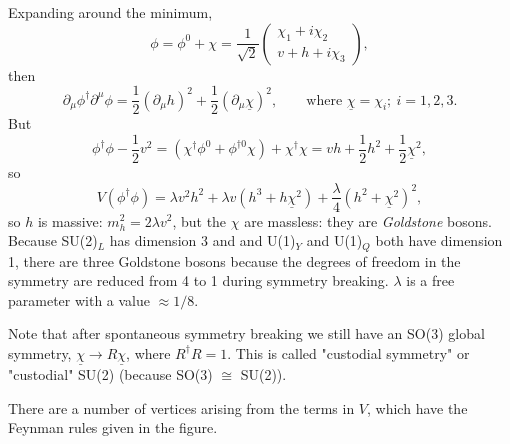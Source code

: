 Expanding around the minimum,
\[\phi = \phi^0 + \chi = \frac{1}{\sqrt{2}} \left( \begin{array}{cc}
\chi_1 + i \chi_2  \\
v + h + i \chi_3  \end{array} \right), \]
then 
\begin{equation}
\partial_\mu \phi^\dagger \partial^\mu \phi = \frac{1}{2} (\partial_\mu h)^2 + \frac{1}{2} (\partial_\mu \underline{\chi})^2, \qquad \text{where } \underline{\chi} = \chi_i; \ i=1,2,3.
\end{equation}
But
\begin{equation}
\phi^\dagger \phi -\frac{1}{2}v^2 = (\chi^\dagger \phi^0 + \phi^{\dagger 0}\chi) + \chi^\dagger \chi = vh + \frac{1}{2}h^2 + \frac{1}{2}\underline{\chi}^2,
\end{equation}
so 
\begin{equation}
V(\phi^\dagger \phi) = \lambda v^2 h^2 + \lambda v (h^3 + h \underline{\chi}^2) + \frac{\lambda}{4}(h^2 + \underline{\chi}^2)^2,
\end{equation}
so $h$ is massive: $m_h^2 = 2 \lambda v^2$, but the $\chi$ are massless: they are \textit{Goldstone} bosons. Because SU(2)$_L$ has dimension 3 and and U(1)$_Y$ and U(1)$_Q$ both have dimension 1, there are three Goldstone bosons because the degrees of freedom in the symmetry are reduced from 4 to 1 during symmetry breaking. $\lambda$ is a free parameter with a value $\approx 1/8$. 

Note that after spontaneous symmetry breaking we still have an SO(3) global symmetry, $\underline{\chi} \to R \underline{\chi}$, where $R^\dagger R =1$. This is called "custodial symmetry" or "custodial" SU(2) (because SO(3) $\cong$ SU(2)).

There are a number of vertices arising from the terms in $V$, which have the Feynman rules given in the figure.
\begin{figure}[!h]
  \centering
  \hfill
\end{figure}
%
